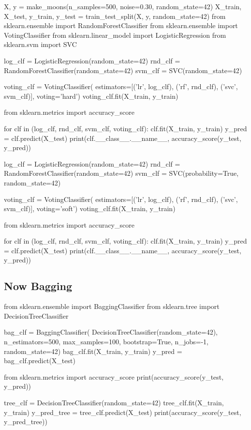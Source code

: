 \documentclass[%
oneside,                 %
final,                   %
10pt]{article}
\begin{document}
X, y = make_moons(n_samples=500, noise=0.30, random_state=42)
X_train, X_test, y_train, y_test = train_test_split(X, y, random_state=42)
from sklearn.ensemble import RandomForestClassifier
from sklearn.ensemble import VotingClassifier
from sklearn.linear_model import LogisticRegression
from sklearn.svm import SVC

log_clf = LogisticRegression(random_state=42)
rnd_clf = RandomForestClassifier(random_state=42)
svm_clf = SVC(random_state=42)

voting_clf = VotingClassifier(
    estimators=[('lr', log_clf), ('rf', rnd_clf), ('svc', svm_clf)],
    voting='hard')
voting_clf.fit(X_train, y_train)
\epycod

\bpycod
from sklearn.metrics import accuracy_score

for clf in (log_clf, rnd_clf, svm_clf, voting_clf):
    clf.fit(X_train, y_train)
    y_pred = clf.predict(X_test)
    print(clf.__class__.__name__, accuracy_score(y_test, y_pred))
\epycod

\bpycod
log_clf = LogisticRegression(random_state=42)
rnd_clf = RandomForestClassifier(random_state=42)
svm_clf = SVC(probability=True, random_state=42)

voting_clf = VotingClassifier(
    estimators=[('lr', log_clf), ('rf', rnd_clf), ('svc', svm_clf)],
    voting='soft')
voting_clf.fit(X_train, y_train)
\epycod

\bpycod
from sklearn.metrics import accuracy_score

for clf in (log_clf, rnd_clf, svm_clf, voting_clf):
    clf.fit(X_train, y_train)
    y_pred = clf.predict(X_test)
    print(clf.__class__.__name__, accuracy_score(y_test, y_pred))
\epycod

\subsection{Now Bagging}

\bpycod
from sklearn.ensemble import BaggingClassifier
from sklearn.tree import DecisionTreeClassifier

bag_clf = BaggingClassifier(
    DecisionTreeClassifier(random_state=42), n_estimators=500,
    max_samples=100, bootstrap=True, n_jobs=-1, random_state=42)
bag_clf.fit(X_train, y_train)
y_pred = bag_clf.predict(X_test)
\epycod


\bpycod
from sklearn.metrics import accuracy_score
print(accuracy_score(y_test, y_pred))
\epycod

\bpycod
tree_clf = DecisionTreeClassifier(random_state=42)
tree_clf.fit(X_train, y_train)
y_pred_tree = tree_clf.predict(X_test)
print(accuracy_score(y_test, y_pred_tree))
\epycod
\end{document}

